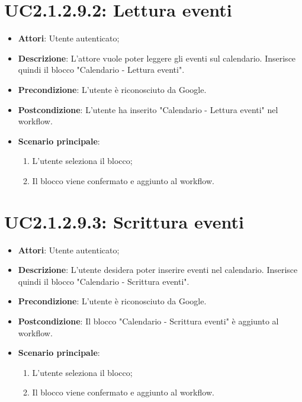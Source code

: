 \section{UC2.1.2.9.2: Lettura eventi}
\label{UC2.1.2.9.2}
\begin{itemize}
	\item \textbf{Attori}: Utente autenticato;
	\item \textbf{Descrizione}: L'attore vuole poter leggere gli eventi sul calendario. Inserisce quindi il blocco "Calendario - Lettura eventi".
	\item \textbf{Precondizione}: L'utente è riconosciuto da Google.
	\item \textbf{Postcondizione}: L'utente ha inserito "Calendario - Lettura eventi" nel workflow.
	\item \textbf{Scenario principale}:
	\begin{enumerate} \item L'utente seleziona il blocco;  \item  Il blocco viene confermato e aggiunto al workflow.\end{enumerate}
\end{itemize}

\section{UC2.1.2.9.3: Scrittura eventi}
\label{UC2.1.2.9.3}
\begin{itemize}
	\item \textbf{Attori}: Utente autenticato;
	\item \textbf{Descrizione}: L'utente desidera poter inserire eventi nel calendario. Inserisce quindi il blocco "Calendario - Scrittura eventi".
	\item \textbf{Precondizione}: L'utente è riconosciuto da Google.
	\item \textbf{Postcondizione}: Il blocco "Calendario - Scrittura eventi" è aggiunto al workflow.
	\item \textbf{Scenario principale}:
	\begin{enumerate} \item L'utente seleziona il blocco;  \item  Il blocco viene confermato e aggiunto al workflow.\end{enumerate}
\end{itemize}


